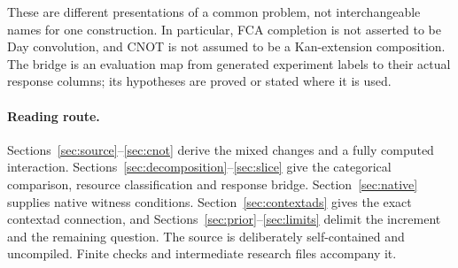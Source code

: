 \documentclass[11pt]{article}
\theoremstyle{definition}\newtheorem{definition}[theorem]{Definition}
\theoremstyle{remark}\newtheorem{remark}[theorem]{Remark}
\begin{document}
These are different presentations of a common problem, not interchangeable
names for one construction. In particular, FCA completion is not asserted
to be Day convolution, and CNOT is not assumed to be a Kan-extension
composition. The bridge is an evaluation map from generated experiment
labels to their actual response columns; its hypotheses are proved or
stated where it is used.

\paragraph{Reading route.}
Sections~\ref{sec:source}--\ref{sec:cnot} derive the mixed changes and a
fully computed interaction. Sections~\ref{sec:decomposition}--\ref{sec:slice}
give the categorical comparison, resource classification and response
bridge. Section~\ref{sec:native} supplies native witness conditions.
Section~\ref{sec:contextads} gives the exact contextad connection, and
Sections~\ref{sec:prior}--\ref{sec:limits} delimit the increment and the
remaining question. The source is deliberately self-contained and
uncompiled. Finite checks and intermediate research files accompany it.
\end{document}
